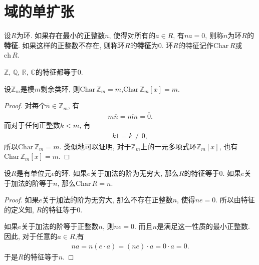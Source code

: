 \documentclass[../../main.tex]{subfiles}%
\begin{document}
\section{域的单扩张}

\begin{definition}[环的特征]
设$R$为环. 如果存在最小的正整数$n$, 使得对所有的$a \in R$, 有$na = 0$, 则称$n$为环$R$的\textbf{特征}. 如果这样的正整数不存在, 则称环$R$的\textbf{特征}为0. 环$R$的特征记作$\mathrm{Char}\, R$或$\text{ch}\,R.$
\end{definition}

\begin{example}
$\mathbb{Z}$, $\mathbb{Q}$, $\mathbb{R}$, $\mathbb{C}$的特征都等于0.
\end{example}

\begin{proposition}\label{proposition:模m剩余类环及其多项式环的特征就是m}
设$\mathbb{Z}_m$是模$m$剩余类环, 则$\mathrm{Char}\,\mathbb{Z}_m = m$,$\mathrm{Char}\,\mathbb{Z}_m[x] = m$.
\end{proposition}
\begin{proof}
对每个$\overline{n} \in \mathbb{Z}_m$, 有
\begin{align*}
m\overline{n} = \overline{mn} = \overline{0}.
\end{align*}
而对于任何正整数$k < m$, 有
\begin{align*}
k\overline{1} = \overline{k} \neq \overline{0},
\end{align*}
所以$\mathrm{Char}\,\mathbb{Z}_m = m$. 类似地可以证明, 对于$\mathbb{Z}_m$上的一元多项式环$\mathbb{Z}_m[x]$, 也有$\mathrm{Char}\,\mathbb{Z}_m[x] = m$.
\end{proof}

\begin{theorem}\label{theorem:环的特征的基本性质-1}
设$R$是有单位元$e$的环. 如果$e$关于加法的阶为无穷大, 那么$R$的特征等于0. 如果$e$关于加法的阶等于$n$, 那么$\mathrm{Char}\, R = n$.
\end{theorem}
\begin{proof}
如果$e$关于加法的阶为无穷大, 那么不存在正整数$n$, 使得$ne = 0$. 所以由特征的定义知, $R$的特征等于0.

如果$e$关于加法的阶等于正整数$n$, 则$ne = 0$. 而且$n$是满足这一性质的最小正整数. 因此, 对于任意的$a \in R$,有
\begin{align*}
na = n(e \cdot a) = (ne) \cdot a = 0 \cdot a = 0.
\end{align*}
于是$R$的特征等于$n$.
\end{proof}
\end{document}
